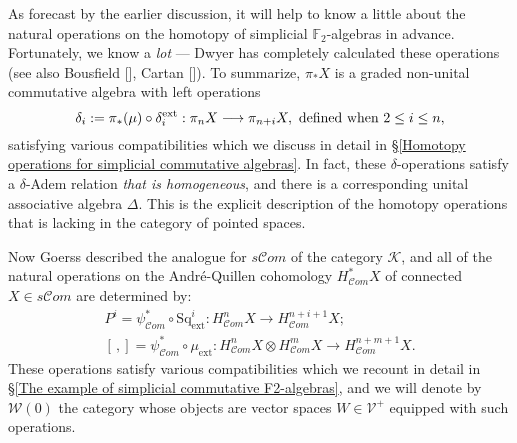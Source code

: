 \documentclass[11pt]{amsart} \renewcommand{\baselinestretch}{1.4}
\theoremstyle{plain}
\theoremstyle{definition}
\renewcommand{\to}{\longrightarrow}
\newcommand{\scrC}{\mathscr{C}}
\newcommand{\calV}{\mathcal{V}}
\newcommand{\calw}{\mathcal{W}}
\newcommand{\calk}{\mathcal{K}}
\newcommand{\vect}[2]{\calV^{#1}_{#2}}
\newcommand{\ExtCohOp}{\mathrm{Sq}_\mathrm{ext}}
\newcommand{\ExtCohProd}{\mu_\mathrm{ext}}
\newcommand{\F}{\mathbb{F}}
\newcommand{\algs}{{\scrC\!\textit{om}}}
\newcommand{\Ftwo}{\F_2}
\begin{document}
\begin{Introduction}
As forecast by the earlier discussion, it will help to know a little about the natural operations on the homotopy of simplicial $\Ftwo$-algebras in advance. Fortunately, we know a \emph{lot} --- Dwyer \cite{DwyerHtpyOpsSimpComAlg.pdf} has completely calculated these operations (see also Bousfield [], Cartan []). To summarize, $\pi_*X$ is a graded non-unital commutative algebra with left operations
\[\delta_i:=\pi_*(\mu)\circ\delta_i^\textup{ext}:\pi_nX\to \pi_{n+i}X,\textup{ defined when }2\leq i\leq n,\]
satisfying various compatibilities which we discuss in detail in \S\ref{Homotopy operations for simplicial commutative algebras}. In fact, these $\delta$-operations satisfy a $\delta$-Adem relation \emph{that is homogeneous}, and there is a corresponding unital associative algebra $\Delta$. This is the explicit description of the homotopy operations that is lacking in the category of pointed spaces.

Now Goerss described the analogue for $s\algs$ of the category $\calk$, and  all of the natural operations on the Andr\'e-Quillen cohomology $H^*_\algs X$ of connected $X\in s\algs$ are determined by:
\begin{gather*}
P^i=\psi^*_{\algs}\circ\ExtCohOp^i:H^n_{\algs}X\to H_{\algs}^{n+i+1}X;\\
[\,,]=\psi^*_{\algs}\circ\ExtCohProd :H_{\algs}^nX\otimes H_{\algs}^mX\to H_{\algs}^{n+m+1}X.
\end{gather*}
These operations satisfy various compatibilities which we recount in detail in \S\ref{The example of simplicial commutative F2-algebras}, and we will denote by $\calw(0)$ the category whose objects are vector spaces $W\in\vect{+}{}$ equipped with such operations.


\end{Introduction}
\end{document}
